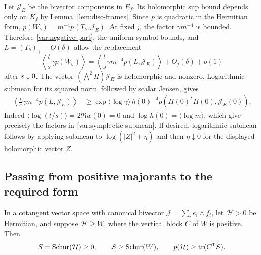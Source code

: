 Let $\mathcal J_E$ be the bivector components in $E_f$.  Its holomorphic
sup bound depends only on $K_j$ by Lemma~\ref{lem:disc-frames}.
Since $p$ is quadratic in the Hermitian form,
$p(W_b)=m^{-4}p(T_b,\mathcal J_E)$.
At fixed $j$, the factor $\gamma m^{-4}$ is bounded.  Therefore
\eqref{var:negative-part}, the uniform symbol bounds, and
$L=(T_b)_++O(\delta)$ allow the replacement
\begin{equation}
 \left\langle\frac ts\gamma p(W_b)\right\rangle
 =\left\langle\frac ts\gamma m^{-4}p(L,\mathcal J_E)\right\rangle
       +O_j(\delta)+o(1)
 \label{var:positive-replacement}
\end{equation}
after $\varepsilon\downarrow0$.
The vector $(\bigwedge^2H)\mathcal J_E$ is holomorphic and nonzero.
Logarithmic submean for its squared norm, followed by scalar Jensen,
gives
\begin{equation}
 \begin{split}
 \left\langle\frac ts\gamma m^{-4}p(L,\mathcal J_E)\right\rangle
 &\ge \exp\langle\log\gamma\rangle\,
 h(0)^{-4}p(H(0)^*H(0),\mathcal J_E(0)).
 \end{split}
 \label{var:symplectic-submean}
\end{equation}
Indeed $\langle\log(t/s)\rangle=2\Re w(0)=0$ and
$\log h(0)=\langle\log m\rangle$, which give precisely the factors
in \eqref{var:symplectic-submean}.  If desired, logarithmic submean
follows by applying submean to $\log(|Z|^2+\eta)$ and then
$\eta\downarrow0$ for the displayed holomorphic vector $Z$.

\subsection{Passing from positive majorants to the required form}

\begin{lemma}
\label{lem:symplectic-schur}
In a cotangent vector space with canonical bivector
$\mathcal J=\sum_i e_i\wedge f_i$, let $\mathcal H>0$ be Hermitian,
and suppose $\mathcal H\ge W$, where the vertical block $C$ of $W$
is positive.  Then
\begin{equation}
 S=\operatorname{Schur}(\mathcal H)\ge0,\qquad
 S\ge\operatorname{Schur}(W),\qquad p(\mathcal H)\ge\operatorname{tr}(C^{\mathsf T}S).
 \label{var:schur-cost}
\end{equation}
\end{lemma}

